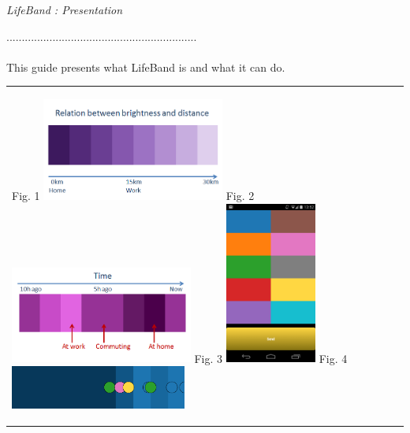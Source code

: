 \documentclass[11pt]{article}
\begin{document}
\begin{center}
\begin{large}
\textsl{LifeBand : Presentation} \\
\end{large}
.............................................................. \\
\end{center}

\paragraph{} This guide presents what LifeBand is and what it can do.

\begin{tabular}{p{6.5cm}p{10cm}}
\begin{center}
Fig. 1 \newline
\includegraphics[width=6cm]{scale.png}\newline\newline
Fig. 2 \newline
\includegraphics[width=6cm]{timeline.png}\newline\newline
Fig. 3 \newline
\includegraphics[width=3cm]{color.png}\newline\newline
Fig. 4 \newline
\includegraphics[width=5.8cm]{nudges.png}\newline
\end{center}
&

\end{tabular}
\end{document}
